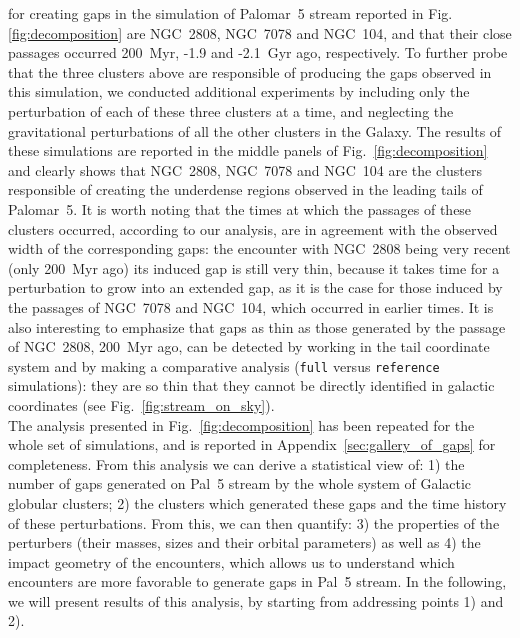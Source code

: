 \documentclass[draft]{aa}
\begin{document}
for creating gaps in the simulation of Palomar~5 stream reported in Fig.\ref{fig:decomposition} are NGC~2808, NGC~7078 and NGC~104, and that their close passages occurred 200~Myr, -1.9 and -2.1~Gyr ago, respectively. To further probe that the three clusters above are responsible of producing the gaps observed in this simulation, we conducted additional experiments by including only the perturbation of each of these three clusters at a time, and neglecting the gravitational perturbations of all the other clusters in the Galaxy. The results of these simulations are reported in the middle panels of Fig.~\ref{fig:decomposition} and clearly shows that NGC~2808, NGC~7078 and NGC~104 are the clusters responsible of creating the underdense regions observed in the leading tails of Palomar~5. It is worth noting that the times at which the passages of these clusters occurred, according to our analysis, are in agreement with the observed width of the corresponding gaps: the encounter with NGC~2808 being very recent (only 200~Myr ago) its induced gap is still very thin, because it takes time for a perturbation to grow into an extended gap, as it is the case for those induced by the passages of  NGC~7078 and NGC~104, which occurred in earlier times. It is also interesting to emphasize that gaps as thin as those generated by the passage of NGC~2808, 200~Myr ago, can be detected by working in the tail coordinate system and by making a comparative analysis (\texttt{full} versus \texttt{reference} simulations): they are so thin that they cannot be directly identified in galactic coordinates (see Fig.~\ref{fig:stream_on_sky}).\\

    The analysis presented in Fig.~\ref{fig:decomposition} has been repeated for the whole set of simulations, and is reported in Appendix~\ref{sec:gallery_of_gaps} for completeness. From this analysis we can derive a statistical view of: 1) the number of gaps generated on Pal~5 stream by the whole system of Galactic globular clusters; 2) the clusters which generated these gaps and the time history of these perturbations. From this, we can then quantify: 3) the properties of the perturbers (their masses, sizes and their orbital parameters) as well as 4) the impact geometry of the encounters, which allows us to understand which encounters are more favorable to generate gaps in Pal~5 stream. In the following, we will present results of this analysis, by starting from addressing points 1) and 2).
\end{document}

